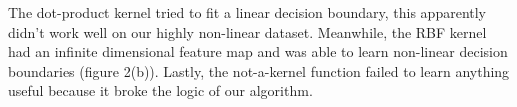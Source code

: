 \begin{answer}
The dot-product kernel tried to fit a linear decision boundary, this apparently didn't work well on our highly non-linear dataset. Meanwhile, the RBF kernel had an infinite dimensional feature map and was able to learn non-linear decision boundaries (figure 2(b)). Lastly, the not-a-kernel function failed to learn anything useful because it broke the logic of our algorithm. \\
\end{answer}

